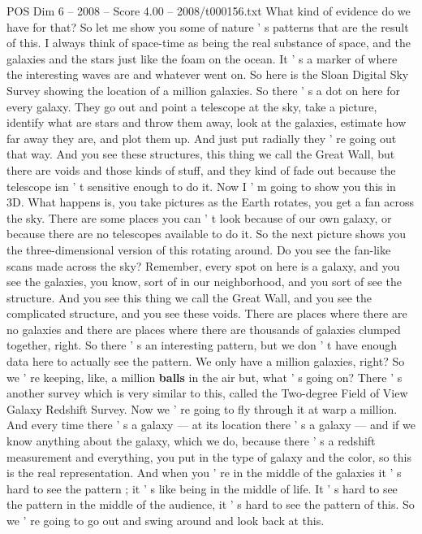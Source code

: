 \begin{textsample}{POS Dim 6 – 2008 – Score 4.00 – 2008/t000156.txt}
What kind of evidence do we have for that?
So let me show you some of nature ' s patterns that are the result of this.
I always think of space-time as being the real substance of space, and the galaxies and the stars just like the foam on the ocean.
It ' s a marker of where the interesting waves are and whatever went on.
So here is the Sloan Digital Sky Survey showing the location of a million galaxies.
So there ' s a dot on here for every galaxy.
They go out and point a telescope at the sky, take a picture, identify what are stars and throw them away, look at the galaxies, estimate how far away they are, and plot them up.
And just put radially they ' re going out that way.
And you see these structures, this thing we call the Great Wall, but there are voids and those kinds of stuff, and they kind of fade out because the telescope isn ' t sensitive enough to do it.
Now I ' m going to show you this in 3D.
What happens is, you take pictures as the Earth rotates, you get a fan across the sky.
There are some places you can ' t look because of our own galaxy, or because there are no telescopes available to do it.
So the next picture shows you the three-dimensional version of this rotating around.
Do you see the fan-like scans made across the sky?
Remember, every spot on here is a galaxy, and you see the galaxies, you know, sort of in our neighborhood, and you sort of see the structure.
And you see this thing we call the Great Wall, and you see the complicated structure, and you see these voids.
There are places where there are no galaxies and there are places where there are thousands of galaxies clumped together, right.
So there ' s an interesting pattern, but we don ' t have enough data here to actually see the pattern.
We only have a million galaxies, right?
So we ' re keeping, like, a million \textbf{balls} in the air but, what ' s going on?
There ' s another survey which is very similar to this, called the Two-degree Field of View Galaxy Redshift Survey.
Now we ' re going to fly through it at warp a million.
And every time there ' s a galaxy — at its location there ' s a galaxy — and if we know anything about the galaxy, which we do, because there ' s a redshift measurement and everything, you put in the type of galaxy and the color, so this is the real representation.
And when you ' re in the middle of the galaxies it ' s hard to see the pattern ; it ' s like being in the middle of life.
It ' s hard to see the pattern in the middle of the audience, it ' s hard to see the pattern of this.
So we ' re going to go out and swing around and look back at this.

\end{textsample}
